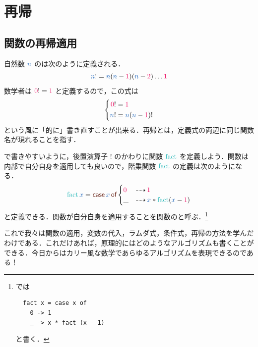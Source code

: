 \documentclass[a5paper,twoside,fleqn,draft]{jsbook}
\begin{document}

\chapter{再帰}
\label{ch:recursion}

\begin{leader}
\end{leader}

\section{関数の再帰適用}

自然数 $\hVar{n}$ のは次のように定義される．
\begin{equation}
  \hVar{n}!=\hVar{n}(\hVar{n}-\hConstant{1})(\hVar{n}-\hConstant{2})\dots\hConstant{1}
\end{equation}
数学者は $\hConstant{0}!=\hConstant{1}$ と定義するので，この式は
\begin{equation}
  \left\{
    \begin{split}
      \hConstant{0}!&=\hConstant{1}\\
      \hVar{n}!&=\hVar{n}(\hVar{n}-\hConstant{1})!
    \end{split}
  \right.
\end{equation}
という風に「的に」書き直すことが出来る．再帰とは，定義式の両辺に同じ関数名が現れることを指す．

\haskell で書きやすいように，後置演算子 $!$ のかわりに関数 $\hFact$ を定義しよう．関数は内部で自分自身を適用しても良いので，階乗関数 $\hFact$ の定義は次のようになる．
\begin{equation}
  \hFact\hVar{x}
  =\hCaseSyntax{\hVar{x}}
  \begin{cases}
    \hConstant{0}
    &\hIfSo\hConstant{1}\\
    \_
    &\hIfSo\hVar{x}*\hFact(\hVar{x}-\hConstant{1})
  \end{cases}
\end{equation}
と定義できる．関数が自分自身を適用することを関数のと呼ぶ．\footnote{\haskell では
\begin{verbatim}
  fact x = case x of
    0 -> 1
    _ -> x * fact (x - 1)
\end{verbatim}
と書く．}

これで我々は関数の適用，変数の代入，ラムダ式，条件式，再帰の方法を学んだわけである．これだけあれば，原理的にはどのようなアルゴリズムも書くことができる．今日からはカリー風な数学であらゆるアルゴリズムを表現できるのである！
\end{document}
